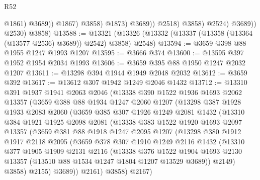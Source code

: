\begin{lexlean}{R52}
\begin{coremodule}
                                  @1861)
                                @3689))
                            @1867)
                          @3858)
                        @1873)
                      @3689))
                  @2518)
                @3858)
              @2524)
            @3689))
        @2530)
      @3858)
@13588 := @13321 (@13326 (@13332 (@13337 (@13358 (@13364 (@13577 @2536) @3689)) @2542) @3858) @2548)
@13594 := @3659 @398 @88 @1955 @1247 @1993 @1207
@13595 := @3666 @374
@13600 := @13595 @397 @1952 @1954 @2034 @1993
@13606 := @3659 @395 @88 @1950 @1247 @2032 @1207
@13611 := @13298 @394 @1944 @1949 @2048 @2032
@13612 := @3659 @392
@13617 := @13612 @307 @1942 @1249 @2046 @1432
@13712 := @13310
    @391
    @1937
    @1941
    @2063
    @2046
    (@13338
      @390
      @1522
      @1936
      @1693
      @2062
      @13357
      (@3659
        @388
        @88
        @1934
        @1247
        @2060
        @1207
        (@13298
          @387
          @1928
          @1933
          @2083
          @2060
          (@3659
            @385
            @307
            @1926
            @1249
            @2081
            @1432
            (@13310
              @384
              @1921
              @1925
              @2098
              @2081
              (@13338
                @383
                @1522
                @1920
                @1693
                @2097
                @13357
                (@3659
                  @381
                  @88
                  @1918
                  @1247
                  @2095
                  @1207
                  (@13298
                    @380
                    @1912
                    @1917
                    @2118
                    @2095
                    (@3659
                      @378
                      @307
                      @1910
                      @1249
                      @2116
                      @1432
                      (@13310
                        @377
                        @1905
                        @1909
                        @2131
                        @2116
                        (@13338
                          @376
                          @1522
                          @1904
                          @1693
                          @2130
                          @13357
                          (@13510 @88 @1534 @1247 @1804 @1207 @13529 @3689))
                        @2149)
                      @3858)
                    @2155)
                  @3689))
              @2161)
            @3858)
          @2167)

\end{coremodule}
\end{lexlean}
